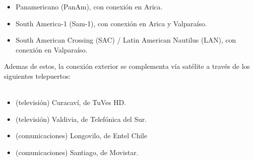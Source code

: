 \documentclass[a4paper,10pt]{article}
\begin{document}
\begin{itemize}
  \item Panamericano (PanAm), con conexión en Arica.
  \item South America-1 (Sam-1), con conexión en Arica y Valparaíso.
  \item South American Crossing (SAC) / Latin American Nautilus (LAN), con conexión en Valparaíso.
\end{itemize}


Ademas de estos, la conexión exterior se complementa vía satélite a través de los siguientes telepuertos: \\ \\

\begin{itemize}
  \item (televisión) Curacaví, de TuVes HD.
  \item (televisión) Valdivia, de Telefónica del Sur.
  \item (comunicaciones) Longovilo, de Entel Chile
  \item (comunicaciones) Santiago, de Movistar.
\end{itemize}
\\
\end{document}
